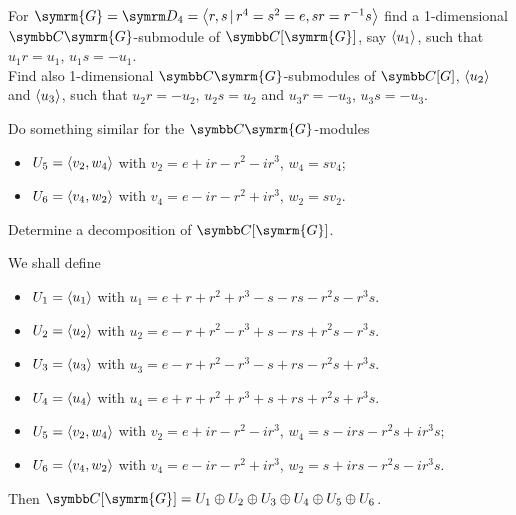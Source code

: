 \begin{exercise}
For \(\symrm{G} = \dihedralgroup{4} = \generatedby{r, s \vbar r^4 = s^2 = e, sr = r^{-1} s}\) find a 1-dimensional \(\complex \symrm{G}\)-submodule of \(\complex[\symrm{G}]\), say \(\left\langle u_1\right\rangle\), such that \(u_1 r = u_1\), \(u_1 s = - u_1\). \\[0.5ex]
Find also 1-dimensional \(\complex \symrm{G}\)-submodules of \(\complex[G]\), \(\left\langle u_2\right\rangle\) and \(\left\langle u_3\right\rangle\), such that \(u_2 r = -u_2\), \(u_2 s = u_2\) and \(u_3 r = -u_3\), \(u_3 s = -u_3\).

Do something similar for the \(\complex \symrm{G}\)-modules
\begin{itemize}
    \item \(U_5 = \left\langle v_2, w_4\right\rangle\) with \(v_2 = e + i r - r^2 - i r^3\), \(w_4 = s v_4\);
    \item \(U_6 = \left\langle v_4, w_2\right\rangle\) with \(v_4 = e - i r - r^2 + i r^3\), \(w_2 = s v_2\).
\end{itemize}
Determine a decomposition of \(\complex[\symrm{G}]\).
\end{exercise}
\begin{solution}
We shall define
\begin{itemize}
    \item \(U_1 = \left\langle u_1\right\rangle\) with \(u_1 = e + r + r^2 + r^3 - s - rs - r^2 s - r^3 s\).
    \item \(U_2 = \left\langle u_2\right\rangle\) with \(u_2 = e - r + r^2 - r^3 + s - rs + r^2 s - r^3 s\).
    \item \(U_3 = \left\langle u_3\right\rangle\) with \(u_3 = e - r + r^2 - r^3 - s + rs - r^2 s + r^3 s\).
    \item \(U_4 = \left\langle u_4\right\rangle\) with \(u_4 = e + r + r^2 + r^3 + s + rs + r^2 s + r^3 s\).
    \item \(U_5 = \left\langle v_2, w_4\right\rangle\) with \(v_2 = e + i r - r^2 - i r^3\), \(w_4 = s - i r s - r^2 s + i r^3 s\);
    \item \(U_6 = \left\langle v_4, w_2\right\rangle\) with \(v_4 = e - i r - r^2 + i r^3\), \(w_2 = s + i r s - r^2 s - i r^3 s\).
\end{itemize}

Then \(\complex[\symrm{G}] = U_1 \oplus U_2 \oplus U_3 \oplus U_4 \oplus U_5 \oplus U_6\).
\end{solution}